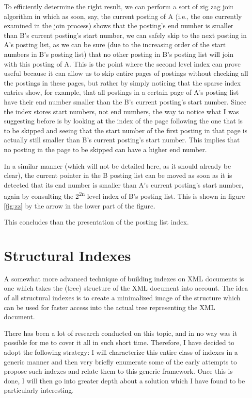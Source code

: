 \documentclass[a4paper,10pt]{article}
\begin{document}
To efficiently determine the right result, we can perform a sort of zig zag join algorithm in
which as soon, say, the current posting of A (i.e., the one currently examined in the join
process)  shows that the posting's end number is smaller than B's current posting's start
number, we can safely skip to the next posting in A's posting list, as we can be sure (due to
the increasing order of the start numbers in B's posting list) that no other posting in B's
posting list will join with this posting of A. This is the point where the second level index can
prove useful because it can allow us to skip entire pages of postings without checking all
the postings in these pages, but rather by simply noticing that the sparse index entries show,
for example, that all postings in a certain page of A's posting list have their end number
smaller than the B's current posting's start number. Since the index stores start numbers,
not end numbers, the way to notice what I was suggesting before is by looking at the index
of the page following the one that is to be skipped and seeing that the start number of the
first posting in that page is actually still smaller than B's current posting's start number.
This implies that no posting in the page to be skipped can have a higher end number.

In a similar manner (which will not be detailed here, as it should already be clear), the
current pointer in the B posting list can be moved as soon as it is detected that its end
number is smaller than A's current posting's start number, again by consulting the 2\textsuperscript{2n}
level index of B's posting list. This is shown in figure \ref{fig:zz} by the arrow in the lower
part of the figure.

This concludes than the presentation of the posting list index.

\section{Structural Indexes}
\label{sec:si}

A somewhat more advanced technique of building indexes on XML documents is one
which takes the (tree) structure of the XML document into account. The idea of all
structural indexes is to create a minimalized image of the structure which can be
used for faster access into the actual tree representing the XML document.

There has been a lot of research conducted on this topic, and in no way was it possible
for me to cover it all in such short time. Therefore, I have decided to adopt the following
strategy: I will characterize this entire class of indexes in a generic manner and then
very briefly enumerate some of the early attempts to propose such indexes and relate
them to this generic framework. Once this is done, I will then go into greater depth about
a solution which I have found to be particularly interesting.
\end{document}
